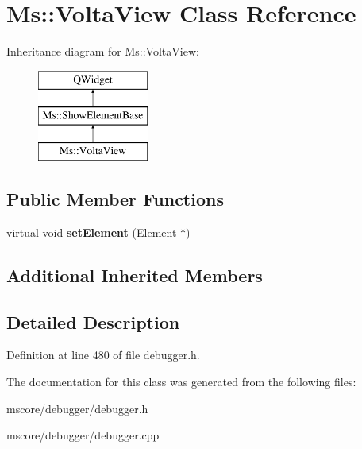 \hypertarget{class_ms_1_1_volta_view}{}\section{Ms\+:\+:Volta\+View Class Reference}
\label{class_ms_1_1_volta_view}
Inheritance diagram for Ms\+:\+:Volta\+View\+:\begin{figure}[H]
\begin{center}
\leavevmode
\includegraphics[height=3.000000cm]{class_ms_1_1_volta_view}
\end{center}
\end{figure}
\subsection*{Public Member Functions}
\begin{DoxyCompactItemize}
\item 
\mbox{\label{class_ms_1_1_volta_view_a6163c185c36ef85194ba2932bbdeb8b8}} 
virtual void {\bfseries set\+Element} (\hyperlink{class_ms_1_1_element}{Element} $\ast$)
\end{DoxyCompactItemize}
\subsection*{Additional Inherited Members}


\subsection{Detailed Description}


Definition at line 480 of file debugger.\+h.



The documentation for this class was generated from the following files\+:\begin{DoxyCompactItemize}
\item 
mscore/debugger/debugger.\+h\item 
mscore/debugger/debugger.\+cpp\end{DoxyCompactItemize}
